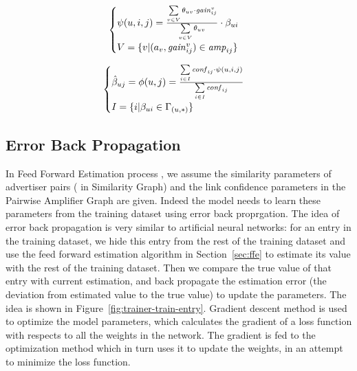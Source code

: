 \newcommand{\wconf}[3]{\sum\limits_{{#2}:\beta_{{#1}{#2}}\in\Gamma_{({#1},*)}} \confi{{#2}{#3}}\cdot \psi({#1},{#2},{#3})}
\newcommand{\sconf}[3]{\sum\limits_{{#2}:\beta_{{#1}{#2}}\in\Gamma_{({#1},*)}} \confi{{#2}{#3}}}

\newcommand{\wtheta}[2]{\sum \limits_{{#2}:(a_{#2},\gain{{#2}}{ij})\in\amp{ij}} \theta_{{#1}{#2}} \cdot \gain{{#2}}{ij}}
\newcommand{\stheta}[2]{\sum \limits_{{#2}:(a_{#2},\gain{{#2}}{ij})\in\amp{ij}} \theta_{{#1}{#2}}}

\begin{equation}
  \label{eq:feedforward_2}
  \begin{cases}   
    \psi (u,i,j) = \frac{\sum \limits_{v\in V} \theta_{uv} \cdot \gain{{v}}{ij}}{\sum \limits_{v\in V} \theta_{uv}} \cdot \beta_{ui} \\
    V=\{v|(a_{v},\gain{{v}}{ij})\in\amp{ij}\}
   \end{cases}
\end{equation}

\begin{equation}
  \label{eq:feedforward_1}
  \begin{cases}    \hat{\beta}_{uj}=\phi(u,j)=\frac{\sum\limits_{i\in I} \confi{ij}\cdot \psi(u,i,j)}{\sum\limits_{i\in I} \confi{ij}} \\
  	    I=\{i|\beta_{ui}\in\Gamma_{(u,*)}\}
  \end{cases}
\end{equation}

\subsection{Error Back Propagation}
\label{sec:bp}

In Feed Forward Estimation process , we assume the similarity
parameters of advertiser pairs ( in Similarity Graph) and the link
confidence parameters in the Pairwise Amplifier Graph are
given. Indeed the model needs to learn these parameters from the
training dataset using error back proprgation.  The idea of error back
propagation is very similar to artificial neural networks: for an
entry in the training dataset, we hide this entry from the rest of the
training dataset and use the feed forward estimation algorithm in
Section~\ref{sec:ffe} to estimate its value with the rest of the
training dataset. Then we compare the true value of that entry with
current estimation, and back propagate the estimation error (the
deviation from estimated value to the true value) to update the
parameters.  The idea is shown in
Figure~\ref{fig:trainer-train-entry}.  Gradient descent method
\cite{?} is used to optimize the model parameters, which calculates
the gradient of a loss function with respects to all the weights in
the network. The gradient is fed to the optimization method which in
turn uses it to update the weights, in an attempt to minimize the loss
function.

